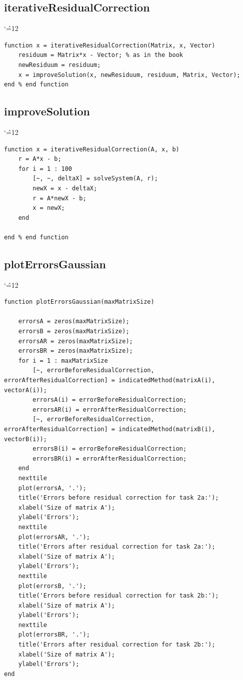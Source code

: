 \documentclass[12pt]{report}
\newenvironment{simplechar}{%
   \catcode`\^=12
}{}
\begin{document}
\subsection{iterativeResidualCorrection}
\begin{simplechar}
\begin{lstlisting}
function x = iterativeResidualCorrection(Matrix, x, Vector)
    residuum = Matrix*x - Vector; % as in the book
    newResiduum = residuum;
    x = improveSolution(x, newResiduum, residuum, Matrix, Vector);
end % end function
\end{lstlisting}
\end{simplechar}

\newpage
\subsection{improveSolution}
\begin{simplechar}
\begin{lstlisting}
function x = iterativeResidualCorrection(A, x, b)
    r = A*x - b;
    for i = 1 : 100
        [~, ~, deltaX] = solveSystem(A, r);
        newX = x - deltaX;
        r = A*newX - b;
        x = newX;
    end

end % end function

\end{lstlisting}
\end{simplechar}

\newpage
\subsection{plotErrorsGaussian}
\begin{simplechar}
\begin{lstlisting}
function plotErrorsGaussian(maxMatrixSize)

    errorsA = zeros(maxMatrixSize);
    errorsB = zeros(maxMatrixSize);
    errorsAR = zeros(maxMatrixSize);
    errorsBR = zeros(maxMatrixSize);
    for i = 1 : maxMatrixSize
        [~, errorBeforeResidualCorrection, errorAfterResidualCorrection] = indicatedMethod(matrixA(i), vectorA(i));
        errorsA(i) = errorBeforeResidualCorrection;
        errorsAR(i) = errorAfterResidualCorrection;
        [~, errorBeforeResidualCorrection, errorAfterResidualCorrection] = indicatedMethod(matrixB(i), vectorB(i));
        errorsB(i) = errorBeforeResidualCorrection;
        errorsBR(i) = errorAfterResidualCorrection;
    end
    nexttile
    plot(errorsA, '.');
    title('Errors before residual correction for task 2a:');
    xlabel('Size of matrix A');
    ylabel('Errors');
    nexttile
    plot(errorsAR, '.');
    title('Errors after residual correction for task 2a:');
    xlabel('Size of matrix A');
    ylabel('Errors');
    nexttile
    plot(errorsB, '.');
    title('Errors before residual correction for task 2b:');
    xlabel('Size of matrix A');
    ylabel('Errors');
    nexttile
    plot(errorsBR, '.');
    title('Errors after residual correction for task 2b:');
    xlabel('Size of matrix A');
    ylabel('Errors');
end
\end{lstlisting}
\end{simplechar}
\end{document}
